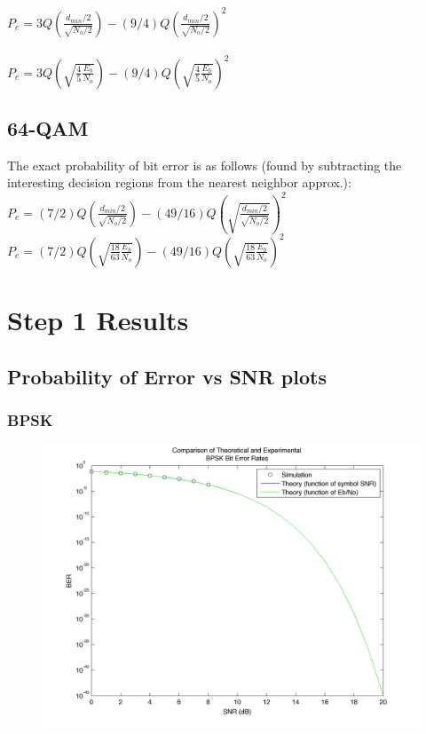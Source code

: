 \documentclass[]{article}
\begin{document}
$ P_e = 3Q(\frac{d_{min}/2}{\sqrt{N_o/2}})-(9/4)Q(\frac{d_{min}/2}{\sqrt{N_o/2}})^2$ \\
\\
$ P_e = 3Q(\sqrt{\frac{4}{5}\frac{E_b}{N_o}})-(9/4)Q(\sqrt{\frac{4}{5}\frac{E_{b}}{N_o}})^2$  \\

\subsection{64-QAM}
\label{sec:qam64}
The exact probability of bit error is as follows (found by subtracting the interesting decision regions from the nearest neighbor approx.):\\

$P_e = (7/2)Q(\frac{d_{min}/2}{\sqrt{N_o/2}}) -(49/16)Q(\sqrt{\frac{d_{min}/2}{\sqrt{N_o/2}}})^2$ \\

$P_e = (7/2)Q(\sqrt{\frac{18}{63}\frac{E_b}{N_o}})-(49/16)Q(\sqrt{\frac{18}{63}\frac{E_b}{N_o}})^2$ \\



\section{Step 1 Results}
\subsection{Probability of Error vs SNR plots}

\subsubsection{BPSK}
\begin{figure}[H]
\centering
\includegraphics[width=\textwidth]{bpSNR.jpg}
\caption{}
\end{figure}
\end{document}
